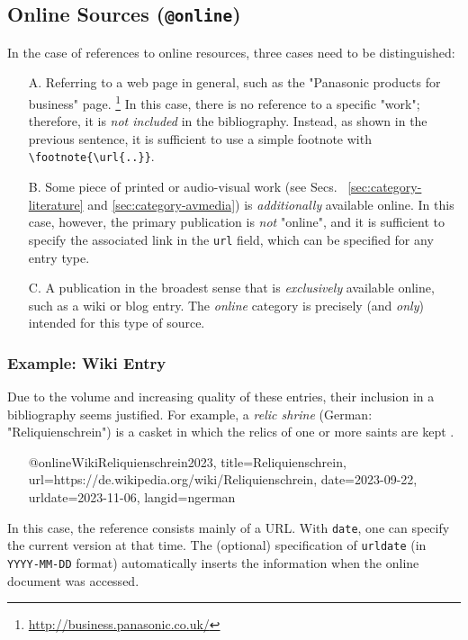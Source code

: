 \subsection{Online Sources (\texttt{\bfseries @online})}
\label{sec:category-online}

In the case of references to online resources, three cases need to be
distinguished:
%
\begin{itemize}
    \item[A.] Referring to a web page in general, such as the "Panasonic
    products for business" page.%
    \footnote{\url{http://business.panasonic.co.uk/}}
    In this case, there is no reference to a specific "work"; therefore, it is
    \emph{not included} in the bibliography. Instead, as shown in the previous
    sentence, it is sufficient to use a simple footnote with
    \verb!\footnote{\url{..}}!.
%
    \item[B.] Some piece of printed or audio-visual work (see Secs.~%
    \ref{sec:category-literature} and \ref{sec:category-avmedia}) is
    \emph{additionally} available online. In this case, however, the primary
    publication is \emph{not} "online", and it is sufficient to specify the
    associated link in the \texttt{url} field, which can be specified for any
    entry type.
%
    \item[C.] A publication in the broadest sense that is
    \emph{exclusively} available online, such as a wiki or blog entry. The \emph{online} category
    is precisely (and \emph{only}) intended for this type of source.
\end{itemize}

\subsubsection{Example: Wiki Entry}
\label{sec:@online-www}

Due to the volume and increasing quality of these entries, their inclusion in
a bibliography seems justified. For example, a \emph{relic shrine} (German:
"Reliquienschrein") is a casket in which the relics of one or more saints are
kept \cite{WikiReliquienschrein2023}.
%
\begin{itemize}
\item[]
\begin{GenericCode}[numbers=none]
@online{WikiReliquienschrein2023,
  title={Reliquienschrein},
  url={https://de.wikipedia.org/wiki/Reliquienschrein},
  date={2023-09-22},
  urldate={2023-11-06},
  langid={ngerman}
}
\end{GenericCode}
\item[\cite{WikiReliquienschrein2023}] 
\end{itemize}
%
In this case, the reference consists mainly of a URL. With \texttt{date}, one
can specify the current version at that time. The (optional) specification of
\texttt{urldate} (in \texttt{YYYY-MM-DD} format) automatically inserts the
information when the online document was accessed.

